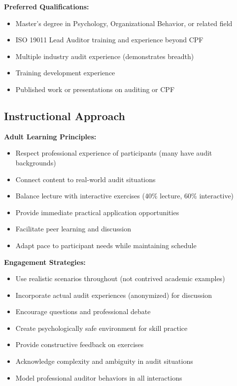 \documentclass[11pt,a4paper]{article}
\begin{document}
\textbf{Preferred Qualifications:}
\begin{itemize}
\item Master's degree in Psychology, Organizational Behavior, or related field
\item ISO 19011 Lead Auditor training and experience beyond CPF
\item Multiple industry audit experience (demonstrates breadth)
\item Training development experience
\item Published work or presentations on auditing or CPF
\end{itemize}

\subsection{Instructional Approach}

\textbf{Adult Learning Principles:}
\begin{itemize}
\item Respect professional experience of participants (many have audit backgrounds)
\item Connect content to real-world audit situations
\item Balance lecture with interactive exercises (40\% lecture, 60\% interactive)
\item Provide immediate practical application opportunities
\item Facilitate peer learning and discussion
\item Adapt pace to participant needs while maintaining schedule
\end{itemize}

\textbf{Engagement Strategies:}
\begin{itemize}
\item Use realistic scenarios throughout (not contrived academic examples)
\item Incorporate actual audit experiences (anonymized) for discussion
\item Encourage questions and professional debate
\item Create psychologically safe environment for skill practice
\item Provide constructive feedback on exercises
\item Acknowledge complexity and ambiguity in audit situations
\item Model professional auditor behaviors in all interactions
\end{itemize}
\end{document}
